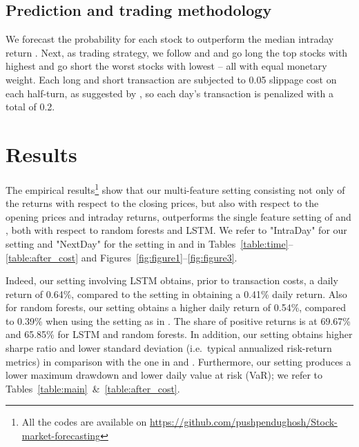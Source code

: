 \documentclass[review]{elsarticle}
\begin{document}
\subsection{Prediction and trading methodology}
We forecast the probability  for each stock  to outperform the median intraday return . Next, as trading strategy, we follow \cite{krauss17} and \cite{krauss18}
and go long the top  stocks with highest  and go short 
the worst  stocks with lowest  -- all with equal monetary weight.  Each long and short transaction are subjected to 0.05 slippage cost on each half-turn, as suggested by \cite{avellaneda2010statistical}, so each day's transaction is penalized with a total of 0.2. 



\section{Results}\label{sec:result}




    
    







The empirical results\footnote{All the codes are available on \url{https://github.com/pushpendughosh/Stock-market-forecasting}} show that our multi-feature setting consisting not only of the returns with respect to the closing prices, but also with respect to the opening prices and intraday returns, outperforms the single feature setting of \cite{krauss17} and \cite{krauss18}, both with respect to random forests and LSTM. We refer to  "IntraDay" for our setting and "NextDay" for the setting in \cite{krauss17} and \cite{krauss18} in Tables~\ref{table:time}--\ref{table:after_cost} and Figures~\ref{fig:figure1}--\ref{fig:figure3}.

Indeed, our setting involving LSTM obtains, prior to transaction costs, a daily return of 0.64\%, compared to the setting in \cite{krauss18} obtaining a 0.41\% daily return. Also for random forests, our setting obtains a higher daily return of 0.54\%, compared to 0.39\% when using the setting as in \cite{krauss17}. The share of positive returns is at 69.67\% and 65.85\%  for LSTM and random forests. In addition,
our setting obtains 
higher sharpe ratio and lower standard deviation (i.e.\ typical annualized risk-return metrics) in comparison with the one in \cite{krauss17} and \cite{krauss18}. Furthermore, our setting produces a lower maximum drawdown and lower daily value at risk (VaR); we refer to Tables~\ref{table:main}~\&~\ref{table:after_cost}. 
\end{document}
